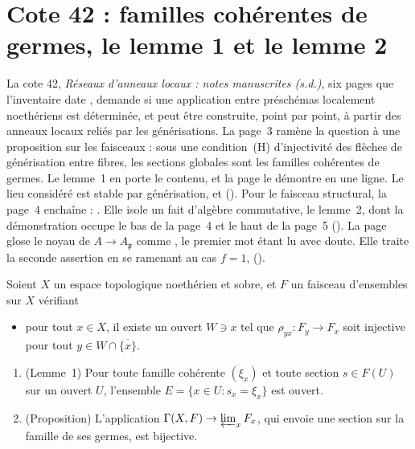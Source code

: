 \section[Cote 42 : familles cohérentes de germes, le lemme 1 et le lemme 2]{Cote 42 : familles cohérentes de germes, le lemme 1 et le lemme 2\protect{}}\label{sec:42}

La cote 42, \emph{Réseaux d'anneaux locaux : notes manuscrites (s.d.)}, six pages que l'inventaire date \q{[années 1960-1970]}, demande si une application entre préschémas localement noethériens est déterminée, et peut être construite, point par point, à partir des anneaux locaux reliés par les générisations. La page~3 ramène la question à une proposition sur les faisceaux : sous une condition~(H) d'injectivité des flèches de générisation entre fibres, les sections globales sont les familles cohérentes de germes. Le lemme~1 en porte le contenu, et la page le démontre en une ligne. Le lieu considéré est stable par générisation, et  (). Pour le faisceau structural, la page~4 enchaîne : . Elle isole un fait d'algèbre commutative, le lemme~2, dont la démonstration occupe le bas de la page~4 et le haut de la page~5 (). La page glose le noyau de $A \to A_{\mathfrak p}$ comme , le premier mot étant lu avec doute. Elle traite la seconde assertion en se ramenant au cas $f = 1$,  ().

\begin{enonce}
Soient $X$ un espace topologique noethérien et sobre, et $F$ un faisceau d'ensembles sur $X$ vérifiant
\begin{itemize}
\item[(H)] pour tout $x \in X$, il existe un ouvert $W \ni x$ tel que $\rho_{yx} : F_y \to F_x$ soit injective pour tout $y \in W \cap \overline{\{x\}}$.
\end{itemize}
\begin{enumerate}
\item (Lemme~1) Pour toute famille cohérente $(\xi_x)$ et toute section $s \in F(U)$ sur un ouvert $U$, l'ensemble $E = \{x \in U : s_x = \xi_x\}$ est ouvert.
\item (Proposition) L'application $\Gamma(X, F) \to \varprojlim_x F_x$, qui envoie une section sur la famille de ses germes, est bijective.
\end{enumerate}
\end{enonce}

